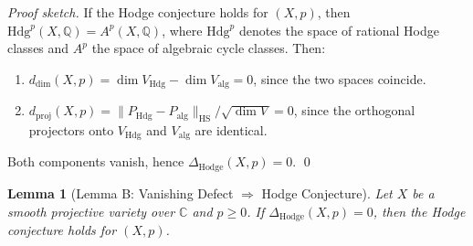 \documentclass[11pt]{article}
\newtheorem{lemma}[theorem]{Lemma}
\theoremstyle{definition}
\begin{document}
\begin{proof}[Proof sketch]
If the Hodge conjecture holds for $(X, p)$, then $\mathrm{Hdg}^p(X, \mathbb{Q}) = A^p(X, \mathbb{Q})$, where $\mathrm{Hdg}^p$ denotes the space of rational Hodge classes and $A^p$ the space of algebraic cycle classes. Then:
\begin{enumerate}
  \item $d_{\mathrm{dim}}(X, p) = \dim V_{\mathrm{Hdg}} - \dim V_{\mathrm{alg}} = 0$, since the two spaces coincide.
  \item $d_{\mathrm{proj}}(X, p) = \|P_{\mathrm{Hdg}} - P_{\mathrm{alg}}\|_{\mathrm{HS}} / \sqrt{\dim V} = 0$, since the orthogonal projectors onto $V_{\mathrm{Hdg}}$ and $V_{\mathrm{alg}}$ are identical.
\end{enumerate}
Both components vanish, hence $\Delta_{\mathrm{Hodge}}(X, p) = 0$. \qed
\end{proof}

\begin{lemma}[Lemma B: Vanishing Defect $\Rightarrow$ Hodge Conjecture]
\label{lem:hodge-B}
Let $X$ be a smooth projective variety over $\mathbb{C}$ and $p \geq 0$. If $\Delta_{\mathrm{Hodge}}(X, p) = 0$, then the Hodge conjecture holds for $(X, p)$.
\end{lemma}
\end{document}
